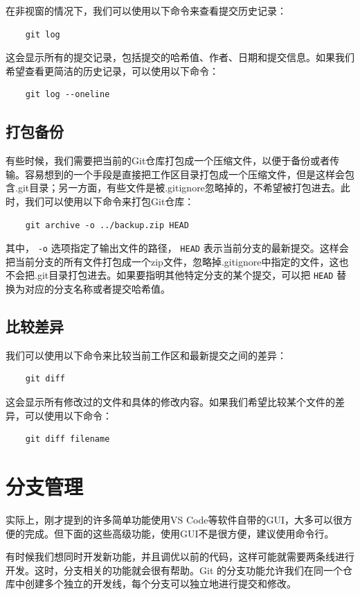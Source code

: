 在非视窗的情况下，我们可以使用以下命令来查看提交历史记录：
\begin{verbatim}
    git log
\end{verbatim}
这会显示所有的提交记录，包括提交的哈希值、作者、日期和提交信息。如果我们希望查看更简洁的历史记录，可以使用以下命令：
\begin{verbatim}
    git log --oneline
\end{verbatim}

\subsection{打包备份}

有些时候，我们需要把当前的Git仓库打包成一个压缩文件，以便于备份或者传输。容易想到的一个手段是直接把工作区目录打包成一个压缩文件，但是这样会包含.git目录；另一方面，有些文件是被.gitignore忽略掉的，不希望被打包进去。此时，我们可以使用以下命令来打包Git仓库：

\begin{verbatim}
    git archive -o ../backup.zip HEAD
\end{verbatim}
其中， \verb|-o| 选项指定了输出文件的路径， \verb|HEAD| 表示当前分支的最新提交。这样会把当前分支的所有文件打包成一个zip文件，忽略掉.gitignore中指定的文件，这也不会把.git目录打包进去。如果要指明其他特定分支的某个提交，可以把 \verb|HEAD| 替换为对应的分支名称或者提交哈希值。

\subsection{比较差异}

我们可以使用以下命令来比较当前工作区和最新提交之间的差异：
\begin{verbatim}
    git diff
\end{verbatim}
这会显示所有修改过的文件和具体的修改内容。如果我们希望比较某个文件的差异，可以使用以下命令：
\begin{verbatim}
    git diff filename
\end{verbatim}

\section{分支管理}

实际上，刚才提到的许多简单功能使用VS Code等软件自带的GUI，大多可以很方便的完成。但下面的这些高级功能，使用GUI不是很方便，建议使用命令行。

有时候我们想同时开发新功能，并且调优以前的代码，这样可能就需要两条线进行开发。这时，分支相关的功能就会很有帮助。Git 的分支功能允许我们在同一个仓库中创建多个独立的开发线，每个分支可以独立地进行提交和修改。

